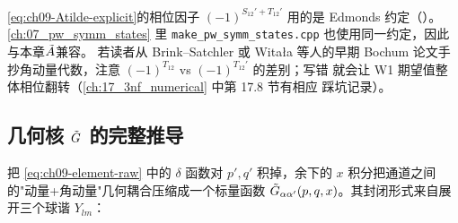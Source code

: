 \begin{remark}
\eqref{eq:ch09-Atilde-explicit}的相位因子 \((-1)^{S_{12}'+T_{12}'}\) 用的是
Edmonds 约定（\cite{Edmonds1957}）。\cref{ch:07_pw_symm_states} 里
\texttt{make\_pw\_symm\_states.cpp} 也使用同一约定，因此与本章\(\tilde{A}\)兼容。
若读者从 Brink--Satchler \cite{BrinkSatchler1968} 或 Witała 等人的早期 Bochum
论文手抄角动量代数，注意 \((-1)^{T_{12}}\) vs \((-1)^{T_{12}'}\) 的差别；写错
就会让 W1 期望值整体相位翻转（\cref{ch:17_3nf_numerical} 中第 17.8 节有相应
踩坑记录）。
\end{remark}

\subsection{几何核 \texorpdfstring{$\tilde{G}$}{Gtilde} 的完整推导}
\label{subsec:ch09-Gtilde}

把 \eqref{eq:ch09-element-raw} 中的 \(\delta\) 函数对 \(p',q'\) 积掉，余下的
\(x\) 积分把通道之间的"动量+角动量"几何耦合压缩成一个标量函数
\(\tilde{G}_{\alpha\alpha'}(p,q,x)\)。其封闭形式来自展开三个球谐 \(Y_{l m}\)：

